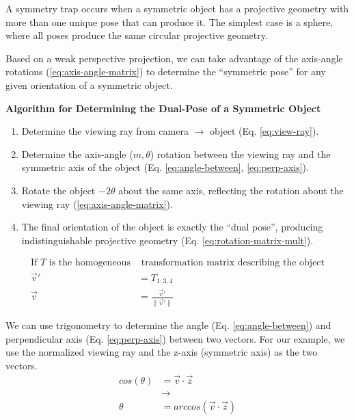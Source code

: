 \begin{mdframed}
    \begin{definition}
        A symmetry trap occurs when a symmetric object has a projective geometry with more than one unique pose that can produce it. The simplest case is a sphere, where all poses produce the same circular projective geometry.
    \end{definition}
\end{mdframed}

Based on a weak perspective projection, we can take advantage of the axis-angle rotations (\cref{eq:axis-angle-matrix}) to determine the ``symmetric pose'' for any given orientation of a symmetric object.

\begin{mdframed}
    \begin{center}
        {\bf Algorithm for Determining the Dual-Pose of a Symmetric Object}
    \end{center}
\begin{enumerate}
    \item Determine the viewing ray from camera $\rightarrow$ object (Eq. \ref{eq:view-ray}).
    \item Determine the axis-angle ($m,\theta$) rotation between the viewing ray and the symmetric axis of the object (Eq. \ref{eq:angle-between}, \ref{eq:perp-axis}).
    \item Rotate the object $-2\theta$ about the same axis, reflecting the rotation about the viewing ray (\cref{eq:axis-angle-matrix}).
    \item The final orientation of the object is exactly the ``dual pose'', producing indistinguishable projective geometry (Eq. \ref{eq:rotation-matrix-mult}).
\end{enumerate}
\end{mdframed}

\begin{equation}
    \begin{aligned}
        \text{If $T$ is the homogeneous}& \text{ transformation matrix describing the object} \\
        \vec{v}' &= T_{1:3,4} \\
        \vec{v} & = \frac{\vec{v}'}{\|\vec{v}'\|}
    \end{aligned}
    \label{eq:view-ray}
\end{equation}


We can use trigonometry to determine the angle (Eq. \ref{eq:angle-between}) and perpendicular axis (Eq. \ref{eq:perp-axis}) between two vectors. For our example, we use the normalized viewing ray and the z-axis (symmetric axis) as the two vectors.
\begin{equation}
    \begin{aligned}
        cos(\theta) &= \vec{v} \cdot \vec{z} \\
        &\rightarrow \\
        \theta &= arccos(\vec{v} \cdot \vec{z})
    \end{aligned}
    \label{eq:angle-between}
\end{equation}

